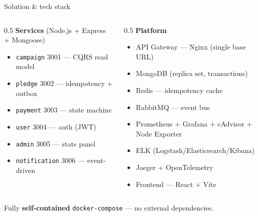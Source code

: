 \documentclass[aspectratio=169]{beamer}
\newcommand{\svc}[1]{\textcolor{brandblue}{\texttt{#1}}}
\begin{document}
\begin{frame}{Solution \& tech stack}
  \begin{columns}[T]
    \begin{column}{0.5\textwidth}
      \textbf{Services} (Node.js + Express + Mongoose)
      \begin{itemize}\small
        \item \svc{campaign} 3001 --- CQRS read model
        \item \svc{pledge} 3002 --- idempotency + outbox
        \item \svc{payment} 3003 --- state machine
        \item \svc{user} 3004 --- auth (JWT)
        \item \svc{admin} 3005 --- stats panel
        \item \svc{notification} 3006 --- event-driven
      \end{itemize}
    \end{column}
    \begin{column}{0.5\textwidth}
      \textbf{Platform}
      \begin{itemize}\small
        \item API Gateway --- Nginx (single base URL)
        \item MongoDB (replica set, transactions)
        \item Redis --- idempotency cache
        \item RabbitMQ --- event bus
        \item Prometheus + Grafana + cAdvisor + Node Exporter
        \item ELK (Logstash/Elasticsearch/Kibana)
        \item Jaeger + OpenTelemetry
        \item Frontend --- React + Vite
      \end{itemize}
    \end{column}
  \end{columns}
  \vfill
  \begin{center}\small Fully \textbf{self-contained} \texttt{docker-compose} --- no external dependencies.\end{center}
\end{frame}
\end{document}
